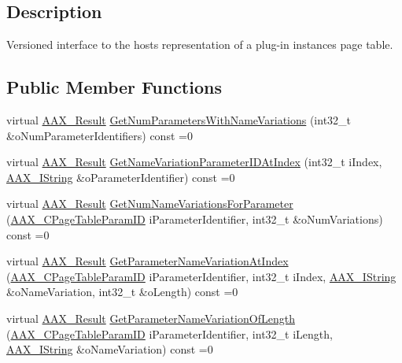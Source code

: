 \subsection{Description}
Versioned interface to the host\textquotesingle{}s representation of a plug-\/in instance\textquotesingle{}s page table. \subsection*{Public Member Functions}
\begin{DoxyCompactItemize}
\item 
virtual \mbox{\hyperlink{a00392_a4d8f69a697df7f70c3a8e9b8ee130d2f}{A\+A\+X\+\_\+\+Result}} \mbox{\hyperlink{a01729_a325487a56b579e64a21dcfe1a2b435e9}{Get\+Num\+Parameters\+With\+Name\+Variations}} (int32\+\_\+t \&o\+Num\+Parameter\+Identifiers) const =0
\item 
virtual \mbox{\hyperlink{a00392_a4d8f69a697df7f70c3a8e9b8ee130d2f}{A\+A\+X\+\_\+\+Result}} \mbox{\hyperlink{a01729_ac342780ed3567c75d8a68458f0a4ff0c}{Get\+Name\+Variation\+Parameter\+I\+D\+At\+Index}} (int32\+\_\+t i\+Index, \mbox{\hyperlink{a01873}{A\+A\+X\+\_\+\+I\+String}} \&o\+Parameter\+Identifier) const =0
\item 
virtual \mbox{\hyperlink{a00392_a4d8f69a697df7f70c3a8e9b8ee130d2f}{A\+A\+X\+\_\+\+Result}} \mbox{\hyperlink{a01729_af0c22a440afacf5e9ebeaccab11ecde3}{Get\+Num\+Name\+Variations\+For\+Parameter}} (\mbox{\hyperlink{a00392_ab4e01b971dac1b25632fd9f710dd8f77}{A\+A\+X\+\_\+\+C\+Page\+Table\+Param\+ID}} i\+Parameter\+Identifier, int32\+\_\+t \&o\+Num\+Variations) const =0
\item 
virtual \mbox{\hyperlink{a00392_a4d8f69a697df7f70c3a8e9b8ee130d2f}{A\+A\+X\+\_\+\+Result}} \mbox{\hyperlink{a01729_ab866525f8d8902ed8782dc01087d71ce}{Get\+Parameter\+Name\+Variation\+At\+Index}} (\mbox{\hyperlink{a00392_ab4e01b971dac1b25632fd9f710dd8f77}{A\+A\+X\+\_\+\+C\+Page\+Table\+Param\+ID}} i\+Parameter\+Identifier, int32\+\_\+t i\+Index, \mbox{\hyperlink{a01873}{A\+A\+X\+\_\+\+I\+String}} \&o\+Name\+Variation, int32\+\_\+t \&o\+Length) const =0
\item 
virtual \mbox{\hyperlink{a00392_a4d8f69a697df7f70c3a8e9b8ee130d2f}{A\+A\+X\+\_\+\+Result}} \mbox{\hyperlink{a01729_ac4de2771c4025a98f83b89fc6104d9b0}{Get\+Parameter\+Name\+Variation\+Of\+Length}} (\mbox{\hyperlink{a00392_ab4e01b971dac1b25632fd9f710dd8f77}{A\+A\+X\+\_\+\+C\+Page\+Table\+Param\+ID}} i\+Parameter\+Identifier, int32\+\_\+t i\+Length, \mbox{\hyperlink{a01873}{A\+A\+X\+\_\+\+I\+String}} \&o\+Name\+Variation) const =0

\end{DoxyCompactItemize}
